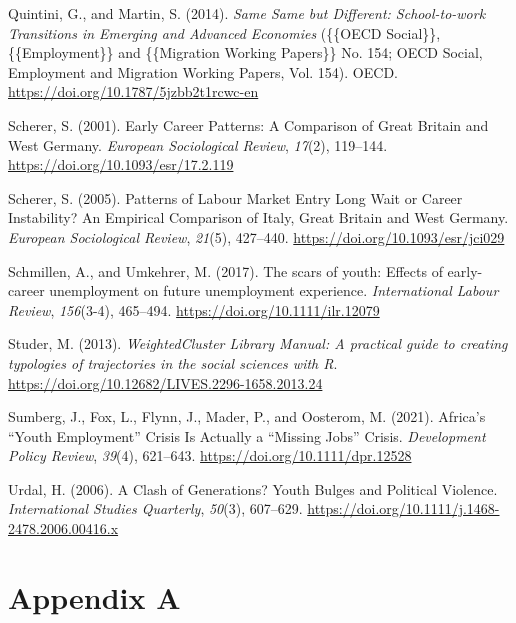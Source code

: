\documentclass[
  11pt,
a4paper
]{article}
\newlength{\cslhangindent}
\newenvironment{CSLReferences}[2] %
 {%
  \setlength{\parindent}{0pt}
  \ifodd #1 \everypar{\setlength{\hangindent}{\cslhangindent}}\ignorespaces\fi
  \ifnum #2 > 0
  \setlength{\parskip}{#2\baselineskip}
  \fi
 }%
 {}
\begin{document}
\begin{CSLReferences}{1}{0}
\leavevmode{}%
Quintini, G., and Martin, S. (2014). \emph{Same {Same} but {Different}: {School-to-work Transitions} in {Emerging} and {Advanced Economies}} (\{\{OECD Social\}\}, \{\{Employment\}\} and \{\{Migration Working Papers\}\} No. 154; {OECD Social}, {Employment} and {Migration Working Papers}, Vol. 154). {OECD}. \url{https://doi.org/10.1787/5jzbb2t1rcwc-en}

\leavevmode{}%
Scherer, S. (2001). Early {Career Patterns}: {A Comparison} of {Great Britain} and {West Germany}. \emph{European Sociological Review}, \emph{17}(2), 119--144. \url{https://doi.org/10.1093/esr/17.2.119}

\leavevmode{}%
Scherer, S. (2005). Patterns of {Labour Market Entry} \textendash{} {Long Wait} or {Career Instability}? {An Empirical Comparison} of {Italy}, {Great Britain} and {West Germany}. \emph{European Sociological Review}, \emph{21}(5), 427--440. \url{https://doi.org/10.1093/esr/jci029}

\leavevmode{}%
Schmillen, A., and Umkehrer, M. (2017). The scars of youth: {Effects} of early-career unemployment on future unemployment experience. \emph{International Labour Review}, \emph{156}(3-4), 465--494. \url{https://doi.org/10.1111/ilr.12079}

\leavevmode{}%
Studer, M. (2013). \emph{{WeightedCluster Library Manual}: {A} practical guide to creating typologies of trajectories in the social sciences with {R}}. \url{https://doi.org/10.12682/LIVES.2296-1658.2013.24}

\leavevmode{}%
Sumberg, J., Fox, L., Flynn, J., Mader, P., and Oosterom, M. (2021). Africa's {``{Youth Employment}''} {Crisis Is Actually} a {``{Missing Jobs}''} {Crisis}. \emph{Development Policy Review}, \emph{39}(4), 621--643. \url{https://doi.org/10.1111/dpr.12528}

\leavevmode{}%
Urdal, H. (2006). A {Clash} of {Generations}? {Youth Bulges} and {Political Violence}. \emph{International Studies Quarterly}, \emph{50}(3), 607--629. \url{https://doi.org/10.1111/j.1468-2478.2006.00416.x}

\end{CSLReferences}

\newpage

\hypertarget{survey-appendix-a}{%
\section*{Appendix A}\label{survey-appendix-a}}
\end{document}
